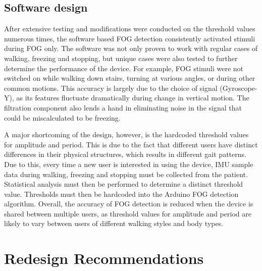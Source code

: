 \documentclass[titlepage]{article}
\begin{document}
\begin{doublespacing}
\subsection{Software design}

After extensive testing and modifications were conducted on the threshold values numerous times, the software based FOG detection consistently activated stimuli during FOG only. The software was not only proven to work with regular cases of walking, freezing and stopping, but unique cases were also tested to further determine the performance of the device. For example, FOG stimuli were not switched on while walking down stairs, turning at various angles, or during other common motions. This accuracy is largely due to the choice of signal (Gyroscope-Y), as its features fluctuate dramatically during change in vertical motion. The filtration component also lends a hand in eliminating noise in the signal that could be miscalculated to be freezing. 

A major shortcoming of the design, however, is the hardcoded threshold values for amplitude and period. This is due to the fact that different users have distinct differences in their physical structures,  which results in different gait patterns. Due to this, every time a new user is interested in using the device, IMU sample data during walking, freezing and stopping must be collected from the patient. Statistical analysis must then be performed to determine a distinct threshold value. Thresholds must then be hardcoded into the Arduino FOG detection algorithm. Overall, the accuracy of FOG detection is reduced when the device is shared between multiple users, as threshold values for amplitude and period are likely to vary between users of different walking styles and body types.

\clearpage
\section{Redesign Recommendations}


\end{doublespacing}
\end{document}
